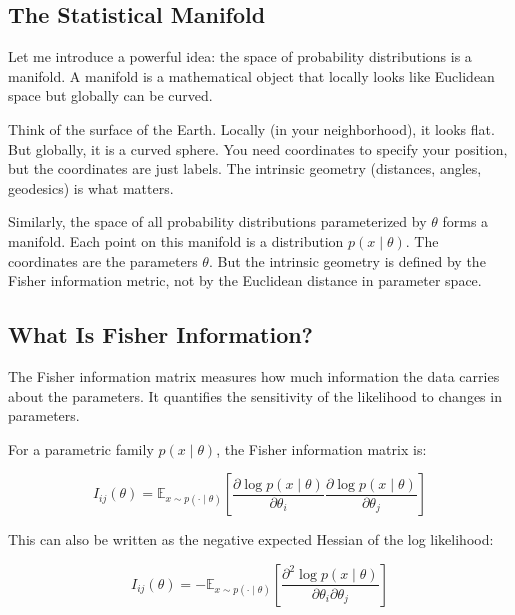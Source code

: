 \subsection{The Statistical Manifold}

Let me introduce a powerful idea: the space of probability distributions is a manifold. A manifold is a mathematical object that locally looks like Euclidean space but globally can be curved.

Think of the surface of the Earth. Locally (in your neighborhood), it looks flat. But globally, it is a curved sphere. You need coordinates to specify your position, but the coordinates are just labels. The intrinsic geometry (distances, angles, geodesics) is what matters.

\vspace{1em}

Similarly, the space of all probability distributions parameterized by $\theta$ forms a manifold. Each point on this manifold is a distribution $p(x \mid \theta)$. The coordinates are the parameters $\theta$. But the intrinsic geometry is defined by the Fisher information metric, not by the Euclidean distance in parameter space.

\vspace{1.5em}

\subsection{What Is Fisher Information?}

The Fisher information matrix measures how much information the data carries about the parameters. It quantifies the sensitivity of the likelihood to changes in parameters.

For a parametric family $p(x \mid \theta)$, the Fisher information matrix is:

\begin{equation}
I_{ij}(\theta) = \mathbb{E}_{x \sim p(\cdot \mid \theta)}\left[\frac{\partial \log p(x \mid \theta)}{\partial \theta_i} \frac{\partial \log p(x \mid \theta)}{\partial \theta_j}\right]
\end{equation}

This can also be written as the negative expected Hessian of the log likelihood:

\begin{equation}
I_{ij}(\theta) = -\mathbb{E}_{x \sim p(\cdot \mid \theta)}\left[\frac{\partial^2 \log p(x \mid \theta)}{\partial \theta_i \partial \theta_j}\right]
\end{equation}

